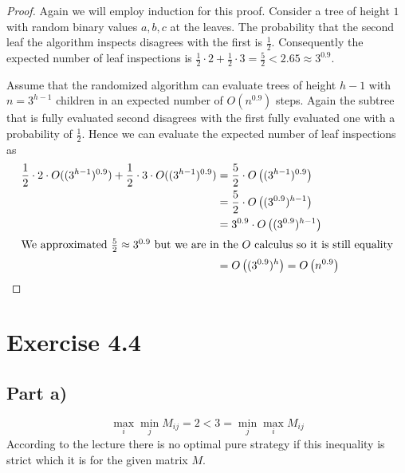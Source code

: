\documentclass[10pt,a4paper]{article}
\begin{document}
\begin{proof}
  Again we will employ induction for this proof.
  Consider a tree of height $1$ with random binary values $a, b, c$ at the leaves.
  The probability that the second leaf the algorithm inspects disagrees with the first is $\frac{1}{2}$.
  Consequently the expected number of leaf inspections is $\frac{1}{2} \cdot 2 + \frac{1}{2} \cdot 3 = \frac{5}{2} < 2.65 \approx 3^{0.9}$.

  Assume that the randomized algorithm can evaluate trees of height $h - 1$ with $n = 3^{h - 1}$ children in an expected number of $O(n^{0.9})$ steps.
  Again the subtree that is fully evaluated second disagrees with the first fully evaluated one with a probability of $\frac{1}{2}$.
  Hence we can evaluate the expected number of leaf inspections as
  \begin{align*}
    \frac{1}{2} \cdot 2 \cdot O((3^{h - 1})^{0.9}) + \frac{1}{2} \cdot 3 \cdot O((3^{h - 1})^{0.9}) & = \frac{5}{2} \cdot O\left((3^{h - 1})^{0.9}\right)\\
                                                                                                    & = \frac{5}{2} \cdot O\left((3^{0.9})^{h - 1}\right)\\
                                                                                                    & = 3^{0.9} \cdot O\left((3^{0.9})^{h - 1}\right)\\
    \intertext{We approximated $\frac{5}{2} \approx 3^{0.9}$ but we are in the $O$ calculus so it is still equality}
                                                                                                    & = O\left((3^{0.9})^{h}\right) = O\left(n^{0.9}\right)
  \end{align*}
\end{proof}

\section*{Exercise 4.4}

\subsection*{Part a)}

\begin{equation*}
  \max_{i} \min_{j} M_{ij} = 2 < 3 = \min_{j} \max_{i} M_{ij}
\end{equation*}
According to the lecture there is no optimal pure strategy if this inequality is strict which it is for the given matrix $M$.
\end{document}
